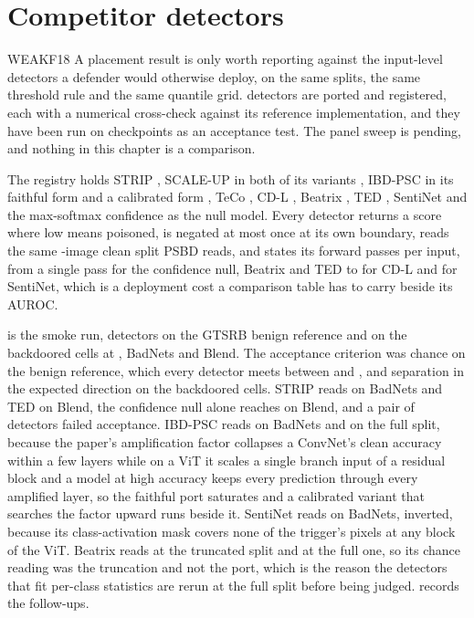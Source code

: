 \documentclass[../main.tex]{subfiles}
\begin{document}
\section{Competitor detectors}
\label{sec:competitors}

\begin{claim}{WEAK}{F18}
A placement result is only worth reporting against the input-level detectors a defender would otherwise deploy, on the same splits, the same threshold rule and the same quantile grid. \RegistryDetectors{} detectors are ported and registered, each with a numerical cross-check against its reference implementation, and they have been run on \SmokeCheckpoints{} checkpoints as an acceptance test. The panel sweep is pending, and nothing in this chapter is a comparison.
\end{claim}

The registry holds STRIP \citep{gao2019strip}, SCALE-UP in both of its variants \citep{guo2023scale}, IBD-PSC in its faithful form and a calibrated form \citep{hou2024ibdpsc}, TeCo \citep{liu2023teco}, CD-L \citep{huang2023distilling}, Beatrix \citep{ma2023beatrix}, TED \citep{mo2024ted}, SentiNet \citep{chou2020sentinet} and the max-softmax confidence as the null model. Every detector returns a score where low means poisoned, is negated at most once at its own boundary, reads the same \HeldoutSize{}-image clean split PSBD reads, and states its forward passes per input, from a single pass for the confidence null, Beatrix and TED to \CdLPasses{} for CD-L and \SentinetPasses{} for SentiNet, which is a deployment cost a comparison table has to carry beside its AUROC.

 is the smoke run, \SmokeDetectors{} detectors on the GTSRB benign reference and on the \SmokeBackdooredCheckpoints{} backdoored cells at \PanelRateMid{}, BadNets and Blend. The acceptance criterion was chance on the benign reference, which every detector meets between \SmokeBenignAurocMin{} and \SmokeBenignAurocMax{}, and separation in the expected direction on the backdoored cells. STRIP reads \SmokeStripBadnetAuroc{} on BadNets and TED \SmokeTedBlendAuroc{} on Blend, the confidence null alone reaches \SmokeConfidenceBlendAuroc{} on Blend, and a pair of detectors failed acceptance. IBD-PSC reads \SmokeIbdPscBadnetAuroc{} on BadNets and \SmokeIbdPscBadnetFullAuroc{} on the full split, because the paper's amplification factor collapses a ConvNet's clean accuracy within a few layers while on a ViT it scales a single branch input of a residual block and a model at high accuracy keeps every prediction through every amplified layer, so the faithful port saturates and a calibrated variant that searches the factor upward runs beside it. SentiNet reads \SmokeSentinetBadnetAuroc{} on BadNets, inverted, because its class-activation mask covers none of the trigger's pixels at any block of the ViT. Beatrix reads \SmokeBeatrixBadnetAuroc{} at the truncated split and \SmokeBeatrixBadnetFullAuroc{} at the full one, so its chance reading was the truncation and not the port, which is the reason the detectors that fit per-class statistics are rerun at the full split before being judged.  records the \SmokeFollowups{} follow-ups.
\end{document}

